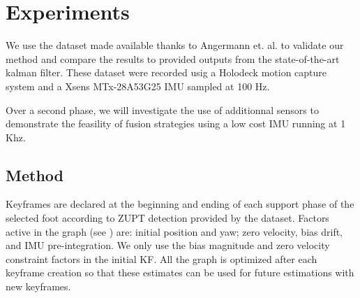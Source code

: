 
\section{Experiments} \label{sec:experiments}

We use the dataset made available thanks to Angermann et. al. \cite{angermann2010high} to validate our method and compare the results to provided outputs from the state-of-the-art kalman filter.
These dataset were recorded usig a Holodeck motion capture system and a Xsens MTx-28A53G25 IMU sampled at 100 Hz. 

Over a second phase, we will investigate the use of additionnal sensors to demonstrate the feasility of fusion strategies using a low cost IMU running at 1 Khz.

\subsection{Method}

Keyframes are declared at the beginning and ending of each support phase of the selected foot according to ZUPT detection provided by the dataset. Factors active in the graph (see ) are: initial position and yaw; zero velocity, bias drift, and IMU pre-integration. We only use the bias magnitude 
and zero velocity constraint factors in the initial KF. All the graph is optimized after each keyframe creation so that these estimates can be used for future estimations with new keyframes.


%

